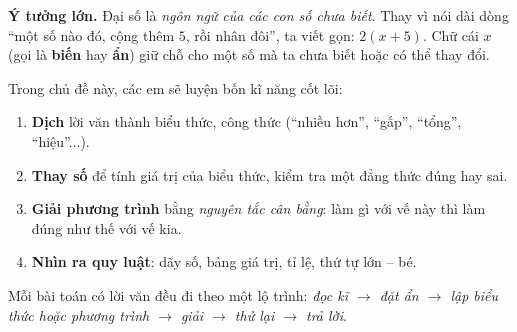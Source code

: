 \documentclass[11pt]{article}
\begin{document}
\begin{knowbox}
\textbf{Ý tưởng lớn.} Đại số là \emph{ngôn ngữ của các con số chưa biết}. Thay vì nói dài dòng
``một số nào đó, cộng thêm $5$, rồi nhân đôi'', ta viết gọn: $2(x+5)$. Chữ cái $x$ (gọi là
\textbf{biến} hay \textbf{ẩn}) giữ chỗ cho một số mà ta chưa biết hoặc có thể thay đổi.

Trong chủ đề này, các em sẽ luyện bốn kĩ năng cốt lõi:
\begin{enumerate}[leftmargin=1.4em,itemsep=1pt,topsep=2pt]
\item \textbf{Dịch} lời văn thành biểu thức, công thức (``nhiều hơn'', ``gấp'', ``tổng'', ``hiệu''...).
\item \textbf{Thay số} để tính giá trị của biểu thức, kiểm tra một đẳng thức đúng hay sai.
\item \textbf{Giải phương trình} bằng \emph{nguyên tắc cân bằng}: làm gì với vế này thì làm đúng như thế với vế kia.
\item \textbf{Nhìn ra quy luật}: dãy số, bảng giá trị, tỉ lệ, thứ tự lớn -- bé.
\end{enumerate}
Mỗi bài toán có lời văn đều đi theo một lộ trình: \emph{đọc kĩ $\to$ đặt ẩn $\to$ lập biểu thức
hoặc phương trình $\to$ giải $\to$ thử lại $\to$ trả lời}.
\end{knowbox}
\vspace{0.3cm}
\end{document}
